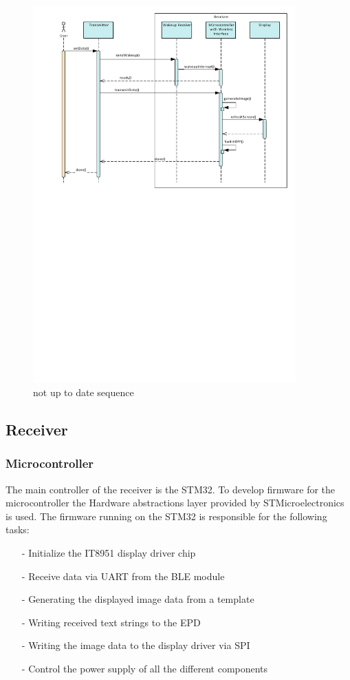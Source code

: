 \begin{figure}[H]
	\centering
	\includegraphics[width=0.9\textwidth]{4-development/software/graphics/sequence.pdf}
	\caption{not up to date sequence\label{software:sequence}}
\end{figure}


\subsection{Receiver}


\subsubsection{Microcontroller}
The main controller of the receiver is the STM32. To develop firmware for the microcontroller the Hardware abstractions layer provided by STMicroelectronics is used. The firmware running on the STM32 is responsible for the following tasks:
\begin{itemize}[H]
	\item[-] Initialize the IT8951 display driver chip
	\item[-] Receive data via UART from the BLE module
	\item[-] Generating the displayed image data from a template
	\item[-] Writing received text strings to the EPD
	\item[-] Writing the image data to the display driver via SPI
	\item[-] Control the power supply of all the different components
\end{itemize}
